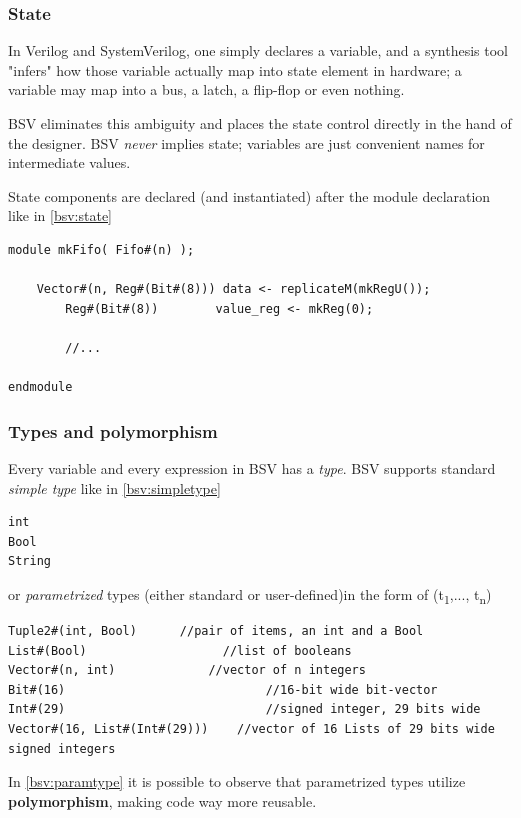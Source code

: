 \documentclass[12pt,oneside,a4paper]{article}
\begin{document}
\subsubsection{State}
In Verilog and SystemVerilog, one simply declares a variable, and a synthesis tool "infers" how those variable actually map into state element in hardware; a variable may map into a bus, a latch, a flip-flop or even nothing.

BSV eliminates this ambiguity and places the state control directly in the hand of the designer. BSV \textit{never} implies state; variables are just convenient names for intermediate values.

State components are declared (and instantiated) after the module declaration like in \cref{bsv:state}

\begin{lstlisting}[label={bsv:state},caption={Example of state declaration}]
module mkFifo( Fifo#(n) );

    Vector#(n, Reg#(Bit#(8))) data <- replicateM(mkRegU());
		Reg#(Bit#(8)) 	  	 value_reg <- mkReg(0);
		
		//...

endmodule
\end{lstlisting}

\subsubsection{Types and polymorphism}

Every variable and every expression in BSV has a \textit{type}.
BSV supports standard \textit{simple type} like in \cref{bsv:simpletype}
\begin{lstlisting}[label={bsv:simpletype},caption={Simple types}]
int
Bool
String
\end{lstlisting}
or \textit{parametrized} types (either standard or user-defined)in the form of {(t\textsubscript{1},..., t\textsubscript{n})}
\begin{lstlisting}[label={bsv:paramtype},caption={Parametrized types}]
Tuple2#(int, Bool)		//pair of items, an int and a Bool
List#(Bool)					  //list of booleans
Vector#(n, int)				//vector of n integers
Bit#(16)							//16-bit wide bit-vector
Int#(29)							//signed integer, 29 bits wide
Vector#(16, List#(Int#(29)))	//vector of 16 Lists of 29 bits wide signed integers
\end{lstlisting}

In \cref{bsv:paramtype} it is possible to observe that parametrized types utilize \textbf{polymorphism}, making code way more reusable.
\end{document}
